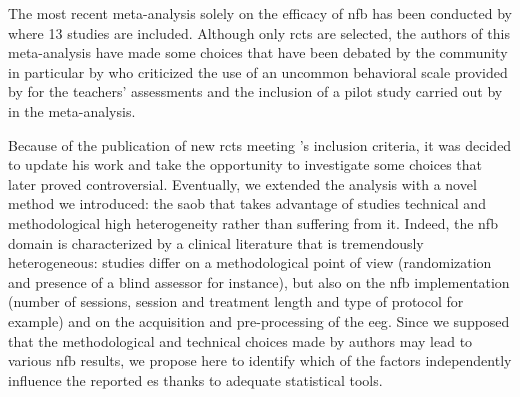 The most recent meta-analysis solely on the efficacy of \gls{nfb} has been conducted by \citet{Cortese2016} where
13 studies are included. Although only \glspl{rct} are selected, the authors of 
this meta-analysis have made some choices that have been debated by the community in particular by 
\citet{Micoulaud2016} who criticized the use of an uncommon behavioral scale provided by \citet{Steiner2014}
for the teachers' assessments and the inclusion of a pilot study carried out by \citet{Arnold2014} in the meta-analysis. 

Because of the publication of new \glspl{rct} meeting \citeauthor{Cortese2016}'s inclusion criteria, it was decided to update his work and take 
the opportunity to investigate some choices that later proved controversial. Eventually, we extended the analysis with a novel method we introduced:
the \gls{saob} that takes advantage of studies technical and methodological high heterogeneity rather than suffering from it. Indeed, the \gls{nfb} 
domain is characterized by a clinical literature that is tremendously heterogeneous: studies differ on a methodological 
point of view (randomization and presence of a blind assessor for instance), but also on the \gls{nfb} implementation (number of sessions,
session and treatment length and type of protocol for example) and on the acquisition and pre-processing of the \gls{eeg}. Since we supposed that the 
methodological and technical choices made by authors may lead to various \gls{nfb} results, we propose here to identify which of the factors 
independently influence the reported \gls{es} thanks to adequate statistical tools.






